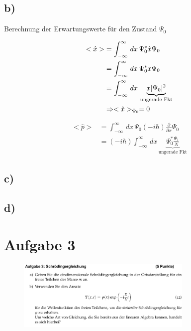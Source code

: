 \subsection{b)}

Berechnung der Erwartungswerte für den Zustand $\Psi _0$

\begin{align}
    <\hat x > &= \int_{-\infty}^{\infty}\,dx\, \Psi _0^* \hat x \Psi _0\\
    &= \int_{-\infty}^{\infty} \,dx\, \Psi _0^* x \Psi _0\\
    &= \int_{-\infty}^{\infty} \,dx\, \underbrace{x \lvert\Psi _0\rvert^2}_{\text{ungerade Fkt}}\\
    &\Rightarrow <\hat x>_{\Phi _0}=0
\end{align}


\begin{align}
    <\hat p > &= \int_{-\infty}^{\infty}\,dx\, \Psi _0 (-i\hbar)\frac{\partial}{\partial x} \Psi _0 \\
    &= (-i \hbar)\int_{-\infty}^{\infty}\,dx\, \underbrace{\Psi_0^* \frac{\Psi _1}{N}}_{\text{ungerade Fkt}}
\end{align}

\subsection{c)}



\subsection{d)}



\section{Aufgabe 3}

\begin{figure}[H]
    \centering
    \includegraphics[width=0.75\textwidth]{images/Aufgabe_3ab.jpg}
    \label{fig:3}
\end{figure}

